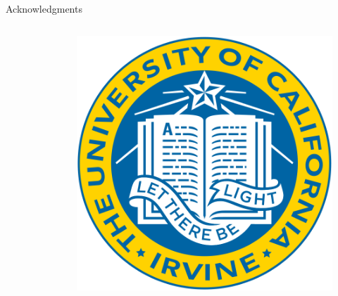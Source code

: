 \documentclass{beamer}
\begin{document}
\begin{frame}{Acknowledgments}
\begin{columns}[c]
\begin{column}{.25\textwidth}
\begin{figure}
            \end{figure}
            \end{column}
            \begin{column}{.25\textwidth}
            \begin{figure}
                \centering
                \includegraphics[width=1\textwidth]{Victoria/Logos/UC, Irvine.png}
            \end{figure}
            \end{column}
        \end{columns}

\end{frame}
\end{document}
